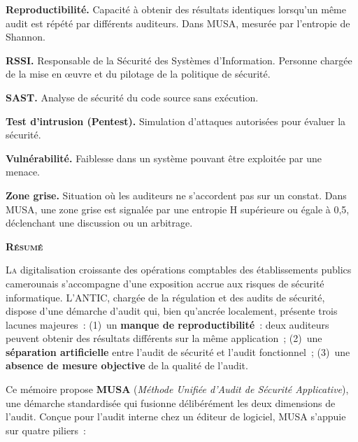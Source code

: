 \documentclass[12pt,a4paper,oneside]{report}
\begin{document}
\smallskip\noindent
\textbf{Reproductibilité.} Capacité à obtenir des résultats identiques lorsqu'un même audit est répété par différents auditeurs. Dans MUSA, mesurée par l'entropie de Shannon.

\smallskip\noindent
\textbf{RSSI.} Responsable de la Sécurité des Systèmes d'Information. Personne chargée de la mise en œuvre et du pilotage de la politique de sécurité.

\smallskip\noindent
\textbf{SAST.} Analyse de sécurité du code source sans exécution.

\smallskip\noindent
\textbf{Test d'intrusion (Pentest).} Simulation d'attaques autorisées pour évaluer la sécurité.

\smallskip\noindent
\textbf{Vulnérabilité.} Faiblesse dans un système pouvant être exploitée par une menace.

\smallskip\noindent
\textbf{Zone grise.} Situation où les auditeurs ne s'accordent pas sur un constat. Dans MUSA, une zone grise est signalée par une entropie H supérieure ou égale à 0,5, déclenchant une discussion ou un arbitrage.
\newpage

\thispagestyle{plain}
\begin{flushright}
	{\Huge\bfseries\scshape\color{navy} R\'esum\'e}
\end{flushright}
\vspace{0.2cm}

\lettrine[lines=3,lhang=0.1,loversize=0.1]{\color{navy}L}{a} digitalisation
croissante des opérations comptables des établissements publics camerounais
s'accompagne d'une exposition accrue aux risques de sécurité informatique.
L'ANTIC, chargée de la régulation et des audits de sécurité, dispose d'une
démarche d'audit qui, bien qu'ancrée localement, présente trois lacunes
majeures~: (1)~un \textbf{manque de reproductibilité}~: deux auditeurs
peuvent obtenir des résultats différents sur la même application~;
(2)~une \textbf{séparation artificielle} entre l'audit de sécurité et
l'audit fonctionnel~; (3)~une \textbf{absence de mesure objective}
de la qualité de l'audit.

\medskip
Ce mémoire propose \textbf{MUSA} (\textit{Méthode Unifiée d'Audit de
	Sécurité Applicative}), une démarche standardisée qui fusionne
délibérément les deux dimensions de l'audit. Conçue pour l'audit
interne chez un éditeur de logiciel, MUSA s'appuie sur quatre piliers~:
\end{document}
